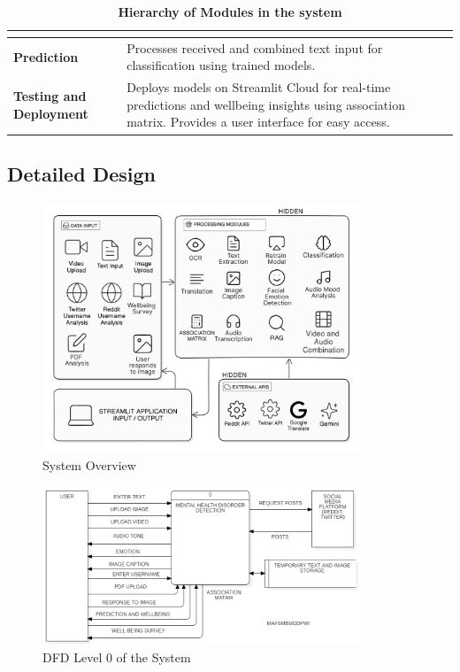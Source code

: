 \begin{table}[H]
\begin{tabularx}{\textwidth}{|p{3.5cm}|X|}
\begin{itemize}
        \end{itemize} \\
        \hline
        \textbf{Prediction} & Processes received and combined text input for classification using trained models. \\
        \hline
        \textbf{Testing and} \newline \textbf{Deployment} & Deploys models on Streamlit Cloud for real-time predictions and wellbeing insights using association matrix. Provides a user interface for easy access. \\
        \hline
    \end{tabularx}
    \caption*{\textbf{Hierarchy of Modules in the system}}
    \label{tab:modules_hierarchy}
\end{table}


\subsection{Detailed Design}
\begin{figure}[h!]  
    \centering
    \includegraphics[width=0.85\textwidth]{Images/System Overview.png}  
    \caption{System Overview}
    \label{System Overview}  %
\end{figure}

\begin{figure}[h!]  
    \centering
    \includegraphics[width=0.85\textwidth]{Images/DFD L0.png}  
    \caption{DFD Level 0 of the System}
    \label{dfdl0123}  %
\end{figure}

